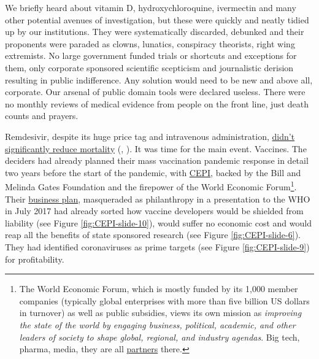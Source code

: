 \documentclass[11pt,a4paper,notitlepage]{report}
\begin{document}
We briefly heard about vitamin D, hydroxychloroquine, ivermectin and many other potential avenues of investigation, but these were quickly and neatly tidied up by our institutions. They were systematically discarded, debunked and their proponents were paraded as clowns, lunatics, conspiracy theorists, right wing extremists. No large government funded trials or shortcuts and exceptions for them, only corporate sponsored scientific scepticism and journalistic derision resulting in public indifference. Any solution would need to be new and above all, corporate. Our arsenal of public domain tools were declared useless. There were no monthly reviews of medical evidence from people on the front line, just death counts and prayers.

Remdesivir, despite its huge price tag and intravenous administration, \href{https://www.thelancet.com/journals/laninf/article/ PIIS1473-3099(21)00485-0/fulltext}{didn’t significantly reduce mortality} (\cite{Ader21}, \cite{Yan2021-pc}). It was time for the main event. Vaccines. The deciders had already planned their mass vaccination pandemic response in detail two years before the start of the pandemic, with \href{https://cepi.net/news_cepi/global-partnership-launched-to-prevent-epidemics-with-new-vaccines/}{CEPI}, backed by the Bill and Melinda Gates Foundation and the firepower of the World Economic Forum\footnote{The World Economic Forum, which is mostly funded by its 1,000 member companies (typically global enterprises with more than five billion US dollars in turnover) as well as public subsidies, views its own mission as \textit{improving the state of the world by engaging business, political, academic, and other leaders of society to shape global, regional, and industry agendas}. Big tech, pharma, media, they are all \href{https://www.weforum.org/partners}{partners} there.}. Their \href{https://www.who.int/medicines/ebola-treatment/TheCoalitionEpidemicPreparednessInnovations-an-overview.pdf}{business plan}, masqueraded as philanthropy in a presentation to the WHO in July 2017 \cite{cepi072017} had already sorted how vaccine developers would be shielded from liability (see Figure \ref{fig:CEPI-slide-10}), would suffer no economic cost and would reap all the benefits of state sponsored research (see Figure \ref{fig:CEPI-slide-6}). They had identified coronaviruses as prime targets (see Figure \ref{fig:CEPI-slide-9}) for profitability.
\end{document}
